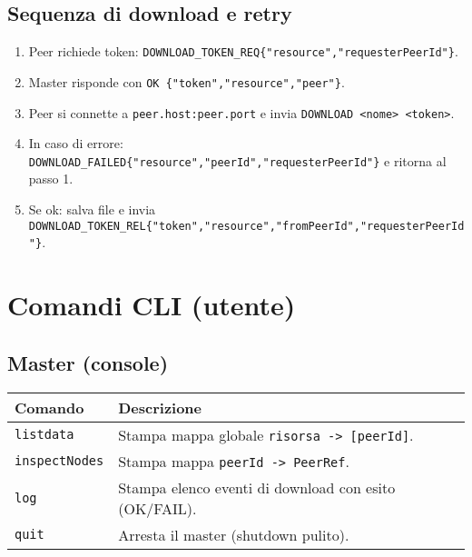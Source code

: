 \documentclass[a4paper,12pt]{article}
\begin{document}
\subsection{Sequenza di download e retry}
\begin{enumerate}[nosep]
  \item Peer richiede token: \texttt{DOWNLOAD\_TOKEN\_REQ\{"resource","requesterPeerId"\}}.
  \item Master risponde con \texttt{OK \{"token","resource","peer"\}}.
  \item Peer si connette a \texttt{peer.host:peer.port} e invia \texttt{DOWNLOAD <nome> <token>}.
  \item In caso di errore: \texttt{DOWNLOAD\_FAILED\{"resource","peerId","requesterPeerId"\}} e ritorna al passo 1.
  \item Se ok: salva file e invia \texttt{DOWNLOAD\_TOKEN\_REL\{"token","resource","fromPeerId","requesterPeerId"\}}.
\end{enumerate}

\section{Comandi CLI (utente)}
\subsection*{Master (console)}
\begin{tabularx}{\linewidth}{@{}lX@{}}
\toprule
\textbf{Comando} & \textbf{Descrizione} \\
\midrule
\texttt{listdata} & Stampa mappa globale \texttt{risorsa -> [peerId]}. \\
\texttt{inspectNodes} & Stampa mappa \texttt{peerId -> PeerRef}. \\
\texttt{log} & Stampa elenco eventi di download con esito (OK/FAIL). \\
\texttt{quit} & Arresta il master (shutdown pulito). \\
\bottomrule
\end{tabularx}
\end{document}
